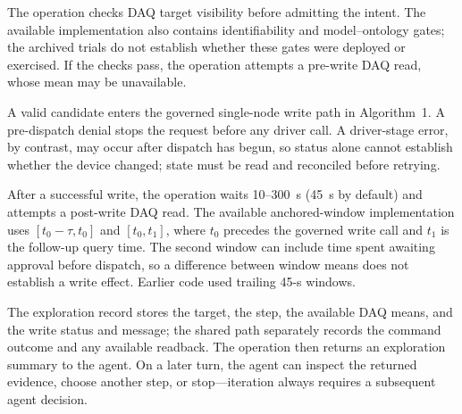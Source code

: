 The operation checks DAQ target visibility before admitting the intent. The available implementation also contains identifiability and model--ontology gates; the archived trials do not establish whether these gates were deployed or exercised. If the checks pass, the operation attempts a pre-write DAQ read, whose mean may be unavailable.

A valid candidate enters the governed single-node write path in Algorithm~1. A pre-dispatch denial stops the request before any driver call. A driver-stage error, by contrast, may occur after dispatch has begun, so status alone cannot establish whether the device changed; state must be read and reconciled before retrying.

After a successful write, the operation waits 10--300~s (45~s by default) and attempts a post-write DAQ read. The available anchored-window implementation uses $[t_0-\tau,t_0]$ and $[t_0,t_1]$, where $t_0$ precedes the governed write call and $t_1$ is the follow-up query time. The second window can include time spent awaiting approval before dispatch, so a difference between window means does not establish a write effect. Earlier code used trailing 45-s windows.

The exploration record stores the target, the step, the available DAQ means, and the write status and message; the shared path separately records the command outcome and any available readback. The operation then returns an exploration summary to the agent. On a later turn, the agent can inspect the returned evidence, choose another step, or stop---iteration always requires a subsequent agent decision.


